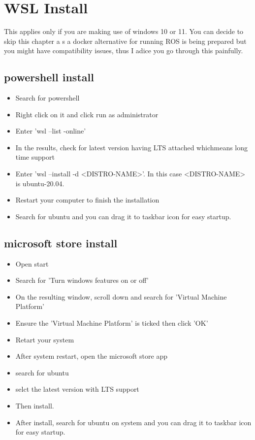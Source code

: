 \documentclass[11pt,fleqn]{book} %
\begin{document}

\tableofcontents %

\chapter{WSL Install}\label{chpter:chapter 1}
This applies only if you are making use of windows 10 or 11. 
You can decide to skip this chapter a s a docker alternative for running 
ROS is being prepared but you might have compatibility issues, thus I adice you go through this 
painfully.
\section{powershell install}
\begin{itemize}
    \item Search for powershell
    \item Right click on it and click run as administrator
    \item Enter 'wsl --list -online'
    \item In the results, check for latest version having LTS attached whichmeans long time support
    \item Enter 'wsl --install -d <DISTRO-NAME>'. In this case <DISTRO-NAME> is ubuntu-20.04.
    \item Restart  your computer to finish the installation
    \item Search for ubuntu and you can drag it to taskbar icon for easy startup.
\end{itemize}
\section{microsoft store install}
\begin{itemize}
    \item Open start
    \item Search for 'Turn windows features on or off'
    \item On the resulting window, scroll down and search for 'Virtual Machine Platform'
    \item Ensure the 'Virtual Machine Platform' is ticked then click 'OK'
    \item Retart your system
    \item After system restart, open the microsoft store app
    \item search for ubuntu
    \item selct the latest version with LTS support
    \item Then install.
    \item After install, search for ubuntu on system and you can drag it to taskbar icon for easy startup.
\end{itemize}
\end{document}
